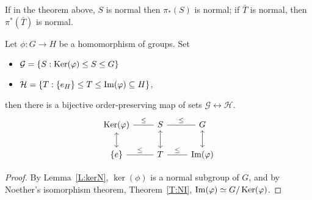 \documentclass{ximera}
\begin{document}
\begin{corollary}
  If in the theorem above, $S$ is normal then $\pi_*(S)$ is normal; if
  $\bar{T}$ is normal, then $\pi^*(\bar{T})$ is normal.
\end{corollary}


\begin{corollary}
  Let $\phi:G\to H$ be a homomorphism of groups. Set
  \begin{itemize}
  \item $\mathcal{G} = \{S:\mathop{\mathrm{Ker}}\nolimits(\varphi)\leq S\leq G\}$
  \item $\mathcal{H} = \{T:\{e_H\}\leq T\leq \operatorname{Im}(\varphi)\subseteq H\}$,
  \end{itemize}
  then there is a bijective order-preserving map of sets
  $\mathcal{G}\leftrightarrow\mathcal{H}$.
  \[
  \begin{tikzcd}
    \ker(\phi) \ar[r,-,"\subgp"] \ar[d,<->]& S\ar[r,-,"\subgp"] \ar[d,<->]& G \ar[d,<->]\\
    \{e\} \ar[r,-,"\subgp"] & T \ar[r,-,"\subgp"] & \im(\phi)
  \end{tikzcd}
  \]
  \begin{proof}
    By Lemma~\ref{L:kerN}, $\ker(\phi)$ is a normal subgroup of $G$,
    and by Noether's isomorphism theorem, Theorem~\ref{T:NI},
    $\operatorname{Im}(\varphi)\simeq G/\mathop{\mathrm{Ker}}\nolimits(\varphi)$.
  \end{proof}
\end{corollary}
\end{document}
